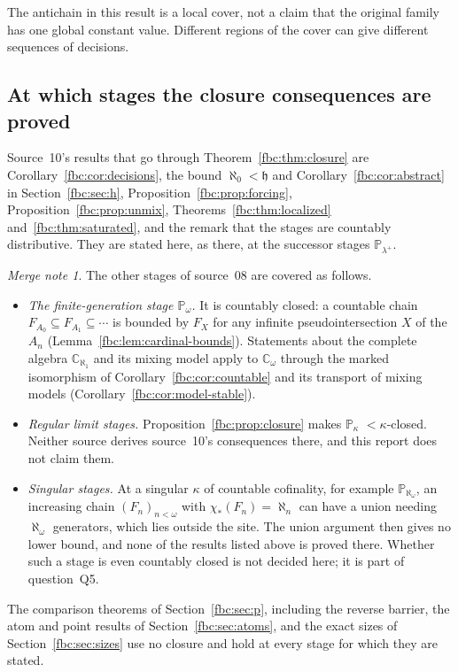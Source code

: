 \documentclass[11pt,letterpaper]{article}
\theoremstyle{definition}
\theoremstyle{remark}
\newtheorem*{mergenote}{Merge note}
\newcommand{\om}{\omega}
\newcommand{\C}{\mathbb C}
\newcommand{\PP}{\mathbb P}
\newcommand{\ch}{\mathfrak h}
\begin{document}
The antichain in this result is a local cover, not a claim that the
original family has one global constant value. Different regions of the
cover can give different sequences of decisions.

\subsection{At which stages the closure consequences are proved}
\label{fbc:sec:closure-scope}
Source~10's results that go through Theorem~\ref{fbc:thm:closure} are
Corollary~\ref{fbc:cor:decisions}, the bound $\aleph_0<\ch$ and
Corollary~\ref{fbc:cor:abstract} in Section~\ref{fbc:sec:h},
Proposition~\ref{fbc:prop:forcing}, Proposition~\ref{fbc:prop:unmix},
Theorems~\ref{fbc:thm:localized} and~\ref{fbc:thm:saturated}, and the
remark that the stages are countably distributive. They are stated
here, as there, at the successor stages $\PP_{\lambda^+}$.

\begin{mergenote}
The other stages of source~08 are covered as follows.
\begin{itemize}
\item \emph{The finite-generation stage $\PP_\om$.} It is countably
closed: a countable chain $F_{A_0}\subseteq F_{A_1}\subseteq\cdots$ is
bounded by $F_X$ for any infinite pseudointersection $X$ of the $A_n$
(Lemma~\ref{fbc:lem:cardinal-bounds}). Statements about the complete
algebra $\C_{\aleph_1}$ and its mixing model apply to $\C_\om$ through the
marked isomorphism of Corollary~\ref{fbc:cor:countable} and its transport
of mixing models (Corollary~\ref{fbc:cor:model-stable}).
\item \emph{Regular limit stages.} Proposition~\ref{fbc:prop:closure}
makes $\PP_\kappa$ $<\kappa$-closed. Neither source derives source~10's
consequences there, and this report does not claim them.
\item \emph{Singular stages.} At a singular $\kappa$ of countable
cofinality, for example $\PP_{\aleph_\om}$, an increasing chain
$(F_n)_{n<\om}$ with $\chi_*(F_n)=\aleph_n$ can have a union needing
$\aleph_\om$ generators, which lies outside the site. The union argument
then gives no lower bound, and none of the results listed above is
proved there. Whether such a stage is even countably closed is not
decided here; it is part of question~Q5.
\end{itemize}
The comparison theorems of Section~\ref{fbc:sec:p}, including the reverse
barrier, the atom and point results of Section~\ref{fbc:sec:atoms}, and
the exact sizes of Section~\ref{fbc:sec:sizes} use no closure and hold at
every stage for which they are stated.
\end{mergenote}
\end{document}
